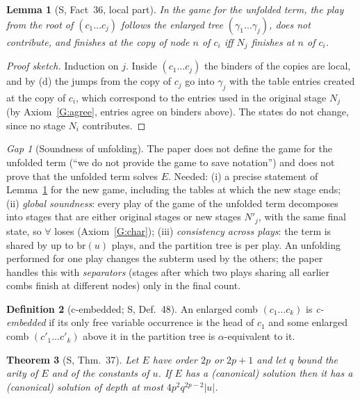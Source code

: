 \documentclass[11pt]{article}
\newcommand{\br}{\mathrm{br}}
\theoremstyle{plain}
\newtheorem{theorem}{Theorem}[section]
\newtheorem{lemma}[theorem]{Lemma}
\theoremstyle{definition}
\newtheorem{definition}[theorem]{Definition}
\theoremstyle{remark}
\newtheorem{gap}{Gap}
\begin{document}
\begin{lemma}[S, Fact~36, local part]\label{lem:unfold-local}
In the game for the unfolded term, the play from the root of
$(c_1\dots c_j)$ follows the enlarged tree $(\gamma_1\dots\gamma_j)$, does
not contribute, and finishes at the copy of node $n$ of $c_i$ iff
$N_j$ finishes at $n$ of $c_i$.
\end{lemma}
\begin{proof}[Proof sketch]
Induction on $j$.  Inside $(c_1\dots c_j)$ the binders of the copies are
local, and by (d) the jumps from the copy of $c_{j}$ go into
$\gamma_j$ with the table entries created at the copy of $c_{i}$, which
correspond to the entries used in the original stage $N_j$ (by
Axiom~\ref{G:agree}, entries agree on binders above).  The states do
not change, since no stage $N_i$ contributes.
\end{proof}

\begin{gap}[Soundness of unfolding]\label{gap:unfold}
The paper does not define the game for the unfolded term (``we do not
provide the game to save notation'') and does not prove that the
unfolded term solves $E$.  Needed: (i) a precise statement of
Lemma~\ref{lem:unfold-local} for the new game, including the tables at
which the new stage ends; (ii) \emph{global soundness}: every play of
the game of the unfolded term decomposes into stages that are either
original stages or new stages $N'_j$, with the same final state, so
$\forall$ loses (Axiom~\ref{G:char}); (iii) \emph{consistency across
plays}: the term is shared by up to $\br(u)$ plays, and the partition
tree is per play.  An unfolding performed for one play changes the
subterm used by the others; the paper handles this with
\emph{separators} (stages after which two plays sharing all earlier
combs finish at different nodes) only in the final count.
\end{gap}

\begin{definition}[c-embedded; S, Def.~48]
An enlarged comb $(c_1\dots c_k)$ is \emph{c-embedded} if its only free
variable occurrence is the head of $c_1$ and some enlarged comb
$(c'_1\dots c'_k)$ above it in the partition tree is $\alpha$-equivalent
to it.
\end{definition}

\begin{theorem}[S, Thm.~37]\label{thm:small}
Let $E$ have order $2p$ or $2p+1$ and let $q$ bound the arity of $E$ and
of the constants of $u$.  If $E$ has a (canonical) solution then it has
a (canonical) solution of depth at most $4p^2q^{2p-2}|u|$.
\end{theorem}
\end{document}
